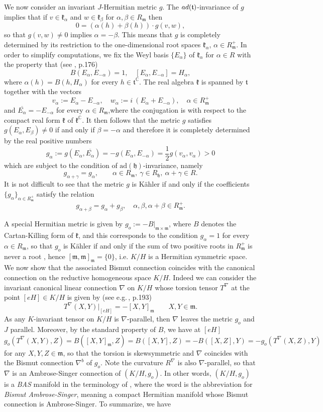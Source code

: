 \documentclass{amsart}
\numberwithin{equation}{section}
\theoremstyle{definition}
\renewcommand{\1}{\mathds{1}}
\renewcommand{\a}{\alpha}
\newcommand{\gk}{\mathfrak k}
\newcommand{\gh}{\mathfrak h}
\newcommand{\gm}{\mathfrak m}
\newcommand{\gt}{\mathfrak t}
\newcommand{\ad}{\rm {ad}}
\renewcommand{\>}{\rightarrow}
\begin{document}
We now consider an invariant $J$-Hermitian metric $g$. The $\ad(\gt)$-invariance of $g$ implies that if $v\in \gk_\alpha$ and $w\in \gk_\beta$ for $\alpha,\beta\in R_\gm$ then
$$0 = (\alpha(h)+ \beta(h)) \cdot g(v,w),$$
so that $g(v,w)\neq 0 $ implies $\alpha = -\beta$. This means that $g$ is completely determined by its restriction to the one-dimensional root spaces $\gk_\alpha$, $\alpha\in R_\gm^+$. In order to simplify computations, we fix the Weyl basis $\{E_\alpha\}$ of $\gk_\alpha$ for $\alpha\in R$ with the property that (see \cite{He}, p.176)
$$B(E_\alpha,E_{-\alpha}) = 1, \quad [E_\alpha,E_{-\alpha}] = H_\alpha,$$
where $\alpha(h) = B(h,H_\alpha)$ for every $h\in \gt^{\mathbb C}$. The real algebra $\gk$ is spanned by $\gt$ together with the vectors
$$v_\alpha := E_\alpha-E_{-\alpha},\quad w_\alpha:= i\ (E_\alpha + E_{-\alpha}),\quad \alpha\in R_\gm^+$$
and $\overline{E_\alpha}= -E_{-\alpha}$ for every $\alpha \in R_\gm$,where the conjugation is with respect to the compact real form $\gk$ of $\gk^\mathbb C$.
It then follows that the metric $g$ satisfies $g(E_\alpha,E_\beta) \neq 0$ if and only if $\beta=-\alpha$ and therefore it is completely determined by the real positive numbers
$$g_\alpha := g(E_\alpha,\overline{E_{\alpha}}) = - g(E_\a,E_{-\a}) = \frac 12 g(v_\alpha,v_\alpha) > 0$$
which are subject to the condition of $\mbox{ad}(\gh)$-invariance, namely
$$g_{\alpha+\gamma} = g_\alpha,\qquad \alpha\in R_\gm,\ \gamma\in R_\gh,\ \alpha+\gamma\in R.$$
It is not difficult to see that the metric $g$ is K\"ahler if and only if the coefficients $\{g_\alpha\}_{\alpha\in R_\gm^+}$ satisfy the relation
$$g_{\alpha+\beta} = g_\alpha + g_\beta,\quad \alpha,\beta,\alpha+\beta\in R_\gm^+.$$

A special Hermitian metric is given by $g_o:= - B|_{\gm \times \gm}$, where $B$ denotes the Cartan-Killing form of $\gk$, and this corresponds to the condition $g_\alpha = 1$ for every $\alpha\in R_\gm$, so that $g_o$ is K\"ahler if and only if the sum of two positive roots in $R_\gm^+$ is never a root , hence $[\gm,\gm]_\gm=\{0\}$, i.e. $K/H$ is a Hermitian symmetric space. We now show that the associated Bismut connection coincides with the canonical connection on the reductive homogeneous space $K/H$. Indeed we can consider the invariant canonical linear connection $\nabla$ on $K/H$ whose torsion tensor $T^\nabla$ at the point $[eH]\in K/H$ is given by (see e.g.\,\cite{KN}, p.193)
$$T^\nabla(X,Y)|_{[eH]} = - [X,Y]_\gm\qquad X,Y\in \gm.$$
As any $K$-invariant tensor on $K/H$ is $\nabla$-parallel, then $\nabla$ leaves the metric $g_o$ and $J$ parallel. Moreover, by the standard property of $B$, we have at $[eH]$
$$g_o(T^\nabla(X,Y),Z) = B([X,Y]_\gm,Z) = B([X,Y],Z) = - B([X,Z],Y) = -g_o(T^\nabla(X,Z),Y)$$
for any $X,Y,Z\in\gm$, so that the torsion is skewsymmetric and $\nabla$ coincides with the Bismut connection $\nabla^b$ of $g_o$. Note the curvature $R^\nabla$ is also $\nabla$-parallel, so that $\nabla$ is an Ambrose-Singer connection of $(K/H,g_o)$. In other words, $(K/H,g_o)$ is a {\em BAS} manifold in the terminology of \cite{NiZheng}, where the word is the abbreviation for {\em Bismut Ambrose-Singer}, meaning a compact Hermitian manifold whose Bismut connection is Ambrose-Singer. To summarize, we have
\end{document}
